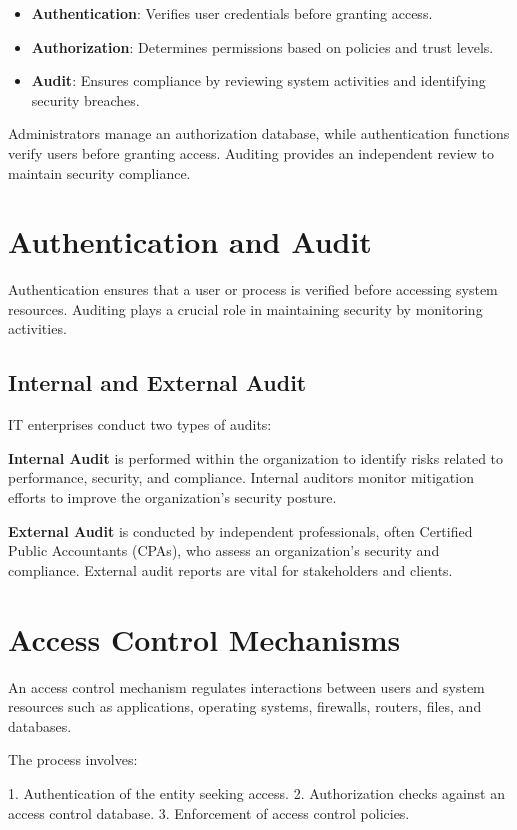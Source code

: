 \begin{itemize}
    \item \textbf{Authentication}: Verifies user credentials before
      granting access.
    \item \textbf{Authorization}: Determines permissions based on
      policies and trust levels.
    \item \textbf{Audit}: Ensures compliance by reviewing system
      activities and identifying security breaches.
\end{itemize}

Administrators manage an authorization database, while authentication
functions verify users before granting access. Auditing provides an
independent review to maintain security compliance.

\section{Authentication and Audit}
Authentication ensures that a user or process is verified before accessing
system resources. Auditing plays a crucial role in maintaining security by
monitoring activities.

\subsection{Internal and External Audit}
IT enterprises conduct two types of audits:

\textbf{Internal Audit} is performed within the organization to identify risks
related to performance, security, and compliance. Internal auditors monitor
mitigation efforts to improve the organization’s security posture.

\textbf{External Audit} is conducted by independent professionals, often
Certified Public Accountants (CPAs), who assess an organization's security and
compliance. External audit reports are vital for stakeholders and clients.

\section{Access Control Mechanisms}
An access control mechanism regulates interactions between users and system
resources such as applications, operating systems, firewalls, routers, files,
and databases.

The process involves:

1. Authentication of the entity seeking access.
2. Authorization checks against an access control database.
3. Enforcement of access control policies.

